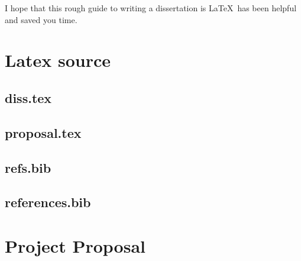 \documentclass[12pt,a4paper,twoside,openright, hidelinks]{report}
\begin{document}
I hope that this rough guide to writing a dissertation is \LaTeX\ has
been helpful and saved you time.




\appendix

\chapter{Latex source}

\section{diss.tex}
{\scriptsize}

\section{proposal.tex}
{\scriptsize}



\section{refs.bib}
{\scriptsize}

\section{references.bib}
{\scriptsize}

\chapter{Project Proposal}


\end{document}
